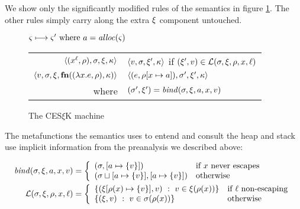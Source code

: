 \documentclass{llncs}
\begin{document}
We show only the significantly modified rules of the semantics in
figure \ref{fig:frame-semantics}. The other rules simply carry along
the extra $\mframe$ component untouched.
\begin{figure}
  \centering
  $\mstate \stepto \mstate' \text{ where } \maddr = \alloc(\mstate)$ \\
  \begin{tabular}{r|l}
    \hline
    $\tpl{(\svar[\mlab]{\mvar}, \menv), \mstore, \mframe, \mkont}$
    &
    $\tpl{\mval,\mstore,\mframe',\mkont}$ if $(\mframe', \mval) \in \lookup(\mstore,\mframe,\menv,\mvar,\mlab)$
    \\
    $\tpl{\mval,\mstore,\mframe,\kfn{\sclo{\slam{\mvar}{\mexpr}}{\menv}, \mkont}}$
    &
    $\tpl{(\mexpr, \extm{\menv}{\mvar}{\maddr}), \mstore', \mframe', \mkont}$
    \\ where & $(\mstore',\mframe') = \bind(\mstore,\mframe,\maddr,\mvar,\mval)$
  \end{tabular}
  \caption{The CES$\xi$K machine}
  \label{fig:frame-semantics}
\end{figure}

The metafunctions the semantics uses to entend and consult the heap
and stack use implicit information from the preanalysis we described
above:

\begin{align*}
  \bind(\mstore,\mframe,\maddr,\mvar,\mval) &=
   \left\{\begin{array}{ll}
            (\mstore, \snglm{\maddr}{\mval}) & \text{if } \mvar \text{ never escapes} \\
            (\joinone{\mstore}{\maddr}{\mval}, \snglm{\maddr}{\mval}) & \text{otherwise } \\
          \end{array}\right. \\
  \lookup(\mstore,\mframe,\menv,\mvar,\mlab) &=
    \left\{\begin{array}{ll}
          \setbuild{(\extm{\mframe}{\menv(\mvar)}{\set{\mval}}, \mval)}
                   {\mval \in \mframe(\menv(\mvar))}
                   & \text{if } \mlab \text{ non-escaping} \\
          \setbuild{(\mframe,\mval)}{\mval \in \mstore(\menv(\mvar))} & \text{otherwise}
           \end{array}\right.
\end{align*}
\end{document}
